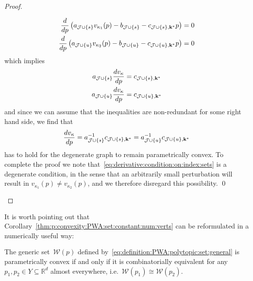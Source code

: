 \documentclass[smallextended]{svjour3}       %
\numberwithin{equation}{section}
\begin{document}
\begin{proof}
\begin{enumerate}
\begin{align*}
  \frac{d}{dp}\left(  a_{\mathcal J\cup \{s\}} v_{\kappa_1}(p) - b_{\mathcal J\cup \{s\}} - 
  c_{\mathcal J\cup \{s\},{\bf{k}}^\ast} p\right) &= 0\\
  \frac{d}{dp}\left(  a_{\mathcal J\cup \{u\}} v_{\kappa_2}(p) - b_{\mathcal J\cup \{u\}} - 
  c_{\mathcal J\cup \{u\},{\bf{k}}^\ast} p\right) &= 0
\end{align*}
%
which implies
\begin{align*}
  a_{\mathcal J\cup \{s\}} \frac{dv_{\kappa}}{dp} &= c_{\mathcal J\cup \{s\},{\bf{k}}^\ast}\\
  a_{\mathcal J\cup \{u\}} \frac{dv_{\kappa}}{dp} &= c_{\mathcal J\cup \{u\},{\bf{k}}^\ast}
\end{align*}
%
and since we can assume that the inequalities are non-redundant for some right hand side, we find that 
%
\begin{equation}\label{eq:derivative:condition:on:index:sets}
  \frac{dv_\kappa}{dp} = a_{\mathcal J\cup \{s\}}^{-1}c_{\mathcal J\cup \{s\},{\bf{k}}^\ast} = 
  a_{\mathcal J\cup \{u\}}^{-1}c_{\mathcal J\cup \{u\},{\bf{k}}^\ast}
\end{equation}
%
has to hold for the degenerate graph to remain parametrically convex.
%
To complete the proof we note that~\eqref{eq:derivative:condition:on:index:sets} is a degenerate condition, in the sense that an arbitrarily small perturbation will result in $v_{\kappa_1}(p) \neq v_{\kappa_2}(p)$, and we therefore disregard this possibility.
\qed
\end{enumerate}
\end{proof}
%
It is worth pointing out that Corollary~\ref{thm:p:convexity:PWA:set:constant:num:verts} can be reformulated in a numerically useful way:
%
\begin{corollary}\label{thm:combinatorical:equivalence:alternative}
The generic set~$\mathcal W(p)$ defined by~\eqref{eq:definition:PWA:polytopic:set:general} is parametrically convex if and only if it is combinatorially equivalent for any $p_1,p_2\in Y\subseteq\mathbb R^d$ almost everywhere, i.e.\ $\mathcal W(p_1)\cong\mathcal W(p_2)$.
\end{corollary}
%
\end{document}
